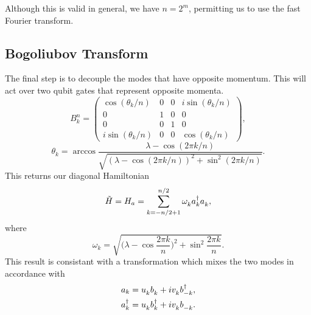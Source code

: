 \documentclass[12pt]{article}
\newcommand*{\iu}{i}
\begin{document}
  Although this is valid in general, we have \( n = 2^{m} \), permitting us to use the fast Fourier transform.

  \subsection{Bogoliubov Transform}
  The final step is to decouple the modes that have opposite momentum. This will act over two qubit gates that represent opposite momenta.
  \begin{equation}
    B_{k}^{n}
      = \begin{pmatrix}
              \cos(\theta_{k} / n) & 0 & 0 & \iu \sin(\theta_{k} / n) \\
                                 0 & 1 & 0 &                        0 \\
                                 0 & 0 & 1 &                        0 \\
          \iu \sin(\theta_{k} / n) & 0 & 0 &     \cos(\theta_{k} / n)
      \end{pmatrix},
  \end{equation}
  \begin{equation}
    \theta_{k}
      = \arccos
        \frac{\lambda - \cos(2 \pi k / n)}
             {\sqrt{(\lambda - \cos(2 \pi k / n))^{2} + \sin^{2}(2 \pi k / n)}}.
  \end{equation}
  This returns our diagonal Hamiltonian
    \begin{equation}
      \tilde{H}
        = H_{a}
        = \sum_{k = -n / 2 + 1}^{n / 2}
          \omega_{k}^{\vphantom{\dagger}} a_{k}^{\dagger}
          a_{k}^{\vphantom{\dagger}},
    \end{equation}
    where
    \begin{equation}
      \omega_{k}
        = \sqrt{\biggl( \lambda - \cos \frac{2\pi k}{n} \biggr)^{2}
                + \sin^{2} \frac{2\pi k}{n}}.
    \end{equation}
    This result is consistant with a transformation which mixes the two modes in accordance with
    \begin{subequations}
      \begin{align}
        a_{k}
          &= u_{k}^{\vphantom{\dagger}} b_{k}^{\vphantom{\dagger}}
             + \iu v_{k}^{\vphantom{\dagger}} b_{-k}^{\dagger}, \\
        a_{k}^{\dagger}
          &= u_{k}^{\vphantom{\dagger}} b_{k}^{\dagger}
             + \iu v_{k}^{\vphantom{\dagger}} b_{-k}^{\vphantom{\dagger}}.
      \end{align}
    \end{subequations}
\end{document}
